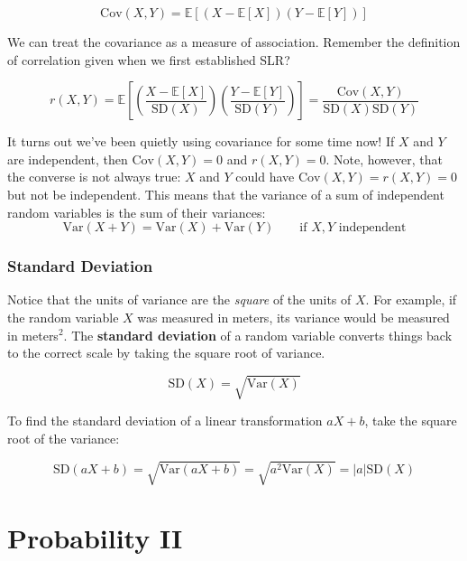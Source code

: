 \documentclass[
  letterpaper,
  DIV=11,
  numbers=noendperiod]{scrreprt}
\begin{document}
\[\text{Cov}(X, Y) = \mathbb{E}[(X - \mathbb{E}[X])(Y - \mathbb{E}[Y])]\]

We can treat the covariance as a measure of association. Remember the
definition of correlation given when we first established SLR?

\[r(X, Y) = \mathbb{E}\left[\left(\frac{X-\mathbb{E}[X]}{\text{SD}(X)}\right)\left(\frac{Y-\mathbb{E}[Y]}{\text{SD}(Y)}\right)\right] = \frac{\text{Cov}(X, Y)}{\text{SD}(X)\text{SD}(Y)}\]

It turns out we've been quietly using covariance for some time now! If
\(X\) and \(Y\) are independent, then \(\text{Cov}(X, Y) =0\) and
\(r(X, Y) = 0\). Note, however, that the converse is not always true:
\(X\) and \(Y\) could have \(\text{Cov}(X, Y) = r(X, Y) = 0\) but not be
independent. This means that the variance of a sum of independent random
variables is the sum of their variances:
\[\text{Var}(X + Y) = \text{Var}(X) + \text{Var}(Y) \qquad \text{if } X, Y \text{ independent}\]

\hypertarget{standard-deviation}{%
\subsection{Standard Deviation}\label{standard-deviation}}

Notice that the units of variance are the \emph{square} of the units of
\(X\). For example, if the random variable \(X\) was measured in meters,
its variance would be measured in meters\(^2\). The \textbf{standard
deviation} of a random variable converts things back to the correct
scale by taking the square root of variance.

\[\text{SD}(X)  = \sqrt{\text{Var}(X)}\]

To find the standard deviation of a linear transformation \(aX+b\), take
the square root of the variance:

\[\text{SD}(aX+b) = \sqrt{\text{Var}(aX+b)} = \sqrt{a^2 \text{Var}(X)} = |a|\text{SD}(X)\]


\hypertarget{probability-ii}{%
\chapter{Probability II}\label{probability-ii}}
\end{document}
